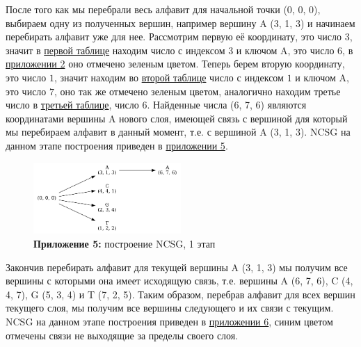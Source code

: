 \documentclass[a4paper,12pt]{extarticle}
\begin{document}
После того как мы перебрали весь алфавит для начальной точки (0, 0, 0), выбираем одну из полученных вершин, например вершину A (3, 1, 3) и начинаем перебирать алфавит уже для нее. Рассмотрим первую её координату, это число $3$, значит в \hyperref[table:2]{первой таблице} находим число с индексом $3$ и ключом A, это число $6$, в \hyperref[table:2]{приложении 2} оно отмечено зеленым цветом. Теперь берем вторую координату, это число $1$, значит находим во \hyperref[table:3]{второй таблице} число с индексом $1$ и ключом A, это число $7$, оно так же отмечено зеленым цветом, аналогично находим третье число в \hyperref[table:4]{третьей таблице}, число $6$. Найденные числа (6, 7, 6) являются координатами вершины A нового слоя, имеющей связь с вершиной для который мы перебираем алфавит в данный момент, т.е. с вершиной A (3, 1, 3). NCSG на данном этапе построения приведен в \hyperref[ncsg:1]{приложении 5}.
\begin{figure}
  \caption*{\textbf{Приложение 5:} построение NCSG, 1 этап}
  \label{ncsg:1}
  \includegraphics[width=0.5\textwidth]{Graph_4.png}
\end{figure}

Закончив перебирать алфавит для текущей вершины A (3, 1, 3) мы получим все вершины с которыми она имеет исходящую связь, т.е. вершины A (6, 7, 6), C (4, 4, 7), G (5, 3, 4) и T (7, 2, 5).
\clearpage
Таким образом, перебрав алфавит для всех вершин текущего слоя, мы получим все вершины следующего и их связи с текущим. NCSG на данном этапе построения приведен в \hyperref[ncsg:2]{приложении 6}, синим цветом отмечены связи не выходящие за пределы своего слоя.
\end{document}
